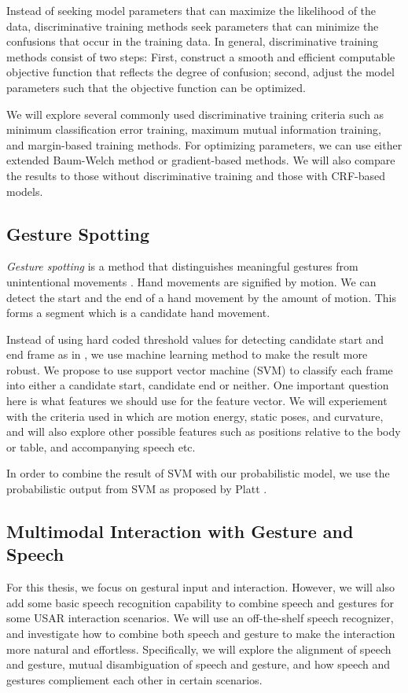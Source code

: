 Instead of seeking model parameters that can maximize the likelihood of the
data, discriminative training methods seek parameters that can minimize the
confusions that occur in the training data. In general, discriminative training
methods consist of two steps: First, construct a smooth and efficient computable
objective function that reflects the degree of confusion; second, adjust the
model parameters such that the objective function can be optimized. 

We will explore several commonly used discriminative training criteria such as
minimum classification error training, maximum mutual
information training, and margin-based training methods. For optimizing
parameters, we can use either extended Baum-Welch method or gradient-based
methods. We will also compare the results to those without discriminative
training and those with CRF-based models.

\subsection{Gesture Spotting}
\textit{Gesture spotting} is a method that
distinguishes meaningful gestures from unintentional movements \cite{kang04}.
Hand movements are signified by motion. We can detect the start and the end of a hand movement by the amount of motion. This forms a segment
which is a candidate hand movement. 

Instead of using hard coded threshold values for detecting candidate
start and end frame as in \cite{kang04}, we use machine learning method to make
the result more robust. We propose to use support vector machine (SVM) to
classify each frame into either a candidate start, candidate end or neither. One
important question here is what features we should use for the feature vector.
We will experiement with the criteria used in \cite{kang04} which are motion
energy, static poses, and curvature, and will also explore other possible
features such as positions relative to the body or table, and accompanying
speech etc.

In order to combine the result of SVM with our probabilistic model, we use the
probabilistic output from SVM as proposed by Platt \cite{platt99}.

\subsection{Multimodal Interaction with Gesture and Speech} 
For this thesis, we focus on gestural input and interaction. However, we will
also add some basic speech recognition capability to combine speech and gestures
for some USAR interaction scenarios. We will use an off-the-shelf speech 
recognizer, and investigate how to combine both speech and gesture to make
the interaction more natural and effortless. Specifically, we will explore the
alignment of speech and gesture, mutual disambiguation of speech and gesture,
and how speech and gestures compliement each other in certain scenarios.

